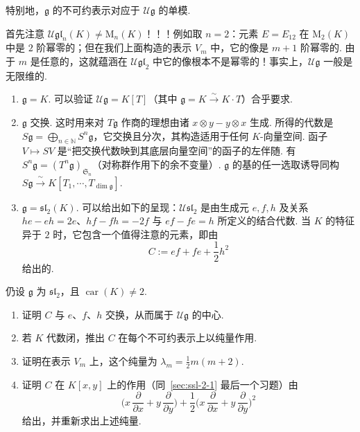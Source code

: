 特别地，$\mathfrak g$ 的不可约表示对应于 $\mathcal{U}\mathfrak g$ 的单模.
\begin{example*}
首先注意 $\mathcal{U}\mathfrak{gl}_{n}(K) \neq \mathrm{M}_{n}(K)$！！！例如取 $n = 2$：元素 $E = E_{12}$ 在 $\mathrm{M}_{2}(K)$ 中是 $2$ 阶幂零的；但在我们上面构造的表示 $V_{m}$ 中，它的像是 $m + 1$ 阶幂零的. 由于 $m$ 是任意的，这就蕴涵在 $\mathcal{U}\mathfrak{gl}_{2}$ 中它的像根本不是幂零的！事实上，$\mathcal{U}\mathfrak g$ 一般是无限维的.
\begin{enumerate}[label=\roman*)]
\item $\mathfrak g = K$. 可以验证 $\mathcal{U}\mathfrak g = K[T]$（其中 $\mathfrak g = K \xrightarrow{\ \sim\ } K \cdot T$）合乎要求.
\item $\mathfrak g$ 交换. 这时用来对 $T\mathfrak g$ 作商的理想由诸 $x \otimes y - y \otimes x$ 生成. 所得的代数是 $S\mathfrak g = \bigoplus_{n \in \mathbb{N}} S^{n}\mathfrak g$，它交换且分次，其构造适用于任何 $K$-向量空间. 函子 $V \mapsto SV$ 是``把交换代数映到其底层向量空间''的函子的左伴随. 有 $S^{n}\mathfrak g = (T^{n}\mathfrak g)_{\mathfrak{S}_{n}}$（对称群作用下的余不变量）. $\mathfrak g$ 的基的任一选取诱导同构 $S\mathfrak g \xrightarrow{\ \sim\ } K[T_{1}, \cdots, T_{\dim\mathfrak g}]$.
\item $\mathfrak g = \mathfrak{sl}_{2}(K)$. 可以给出如下的呈现：$\mathcal{U}\mathfrak{sl}_{2}$ 是由生成元 $e, f, h$ 及关系 $he - eh = 2e$、$hf - fh = -2f$ 与 $ef - fe = h$ 所定义的结合代数. 当 $K$ 的特征异于 $2$ 时，它包含一个值得注意的元素，即由
\[C := ef + fe + \frac{1}{2}h^{2}\]
给出的.
\end{enumerate}
\end{example*}
\begin{exercise*}
仍设 $\mathfrak g$ 为 $\mathfrak{sl}_{2}$，且 $\operatorname{car}(K) \neq 2$.
\begin{enumerate}[label=\alph*)]
\item 证明 $C$ 与 $e$、$f$、$h$ 交换，从而属于 $\mathcal{U}\mathfrak g$ 的中心.
\item 若 $K$ 代数闭，推出 $C$ 在每个不可约表示上以纯量作用.
\item 证明在表示 $V_{m}$ 上，这个纯量为 $\lambda_{m} = \frac{1}{2}m(m + 2)$.
\item 证明 $C$ 在 $K[x, y]$ 上的作用（同~\ref{sec:ssl-2-1} 最后一个习题）由
\[\bigl( x\,\frac{\partial}{\partial x} + y\,\frac{\partial}{\partial y} \bigr) + \frac{1}{2} \bigl( x\,\frac{\partial}{\partial x} + y\,\frac{\partial}{\partial y} \bigr)^{2}\]
给出，并重新求出上述纯量.
\end{enumerate}
\end{exercise*}

